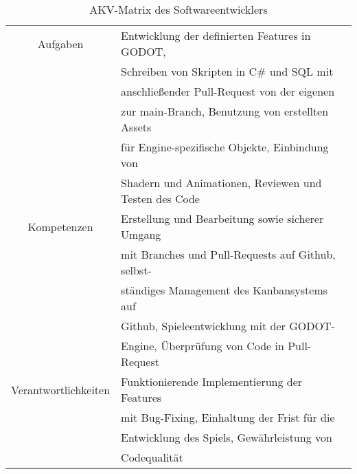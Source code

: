 \begin{table}[H]
    \begin{center}
        \label{tab:softwareentwickler}
        \begin{tabular}{|c||p{9cm}|}
            \hline
            Aufgaben & Entwicklung der definierten Features in GODOT, \\
            & Schreiben von Skripten in C\# und SQL mit \\
            & anschließender Pull-Request von der eigenen \\
            & zur main-Branch, Benutzung von erstellten Assets\\
            & für Engine-spezifische Objekte, Einbindung von \\
            & Shadern und Animationen, Reviewen und Testen des Code \\
            \hline
            Kompetenzen & Erstellung und Bearbeitung sowie sicherer Umgang \\
            & mit Branches und Pull-Requests auf Github, selbst- \\
            & ständiges Management des Kanbansystems auf \\
            & Github, Spieleentwicklung mit der GODOT- \\
            & Engine, Überprüfung von Code in Pull-Request \\
            \hline
            Verantwortlichkeiten & Funktionierende Implementierung der Features \\
            & mit Bug-Fixing, Einhaltung der Frist für die \\
            & Entwicklung des Spiels, Gewährleistung von \\
            & Codequalität \\
            \hline
        \end{tabular}
        \caption{AKV-Matrix des Softwareentwicklers}
    \end{center}
\end{table}
